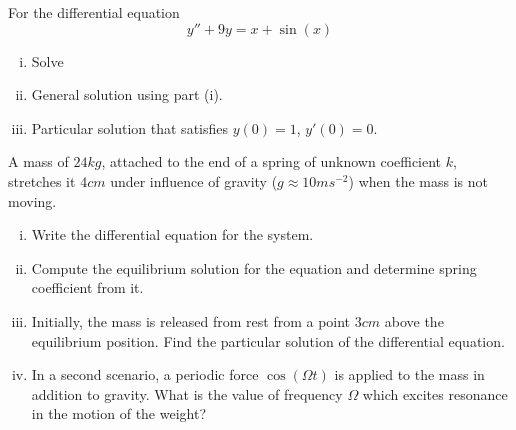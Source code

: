 \begin{question}
For the differential equation
  \[
    y'' + 9y = x + \sin(x)
  \]
  \begin{enumerate}[(i)]
  \item Solve
    \begin{fullwidth}

    \solspace{3in}

    \end{fullwidth}
    \item General solution using part (i). \solspace{0.5in}
  \item Particular solution that satisfies \(y(0)=1\), \(y'(0) = 0\). \solspace{2in}
  \end{enumerate}
\end{question}

\begin{question}
A mass of \(24 \si{kg}\), attached to the end of a spring of unknown coefficient \(k\), stretches it \(4\si{cm}\) under influence of gravity (\(g \approx 10 \si{ms^{-2}}\)) when the mass is not moving.
\begin{enumerate}[(i)]
  \item Write the differential equation for the system.
  \item Compute the equilibrium solution for the equation and determine spring coefficient from it.
  \item Initially, the mass is released from rest from a point \(3 \si{cm}\) above the equilibrium position. Find the particular solution of the differential equation.
\item In a second scenario, a periodic force \(\cos(\Omega t)\) is applied to the mass in addition to gravity. What is the value of frequency \(\Omega\) which excites resonance in the motion of the weight?
\end{enumerate}
\end{question}

